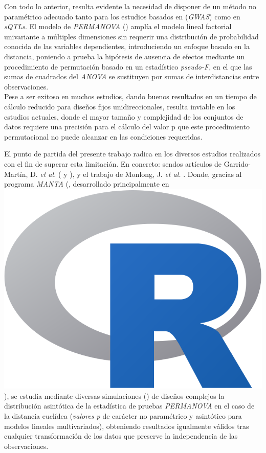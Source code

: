 \documentclass[IB,BIB]{TFUOC}%
\newcommand{\Rlogo}{\protect\includegraphics[height=2.5ex,keepaspectratio]{Rlogo.png}}
\begin{document}
Con todo lo anterior, resulta evidente la necesidad de disponer de un método no paramétrico adecuado tanto para los estudios basados en (\textit{GWAS}) como en \textit{sQTLs}. El modelo de \textit{PERMANOVA} (\cite{anderson_new_2001}) amplía el modelo lineal factorial univariante a múltiples dimensiones sin requerir una distribución de probabilidad conocida de las variables dependientes, introduciendo un enfoque basado en la distancia, poniendo a prueba la hipótesis de ausencia de efectos mediante un procedimiento de permutación basado en un estadístico \textit{\gls{pseudo-F}}, en el que las sumas de cuadrados del \textit{ANOVA} se sustituyen por sumas de interdistancias entre observaciones.\\
Pese a ser exitoso en muchos estudios, dando buenos resultados en un tiempo de cálculo reducido para diseños fijos unidireccionales, resulta inviable en los estudios actuales, donde el mayor tamaño y complejidad de los conjuntos de datos requiere una precisión para el cálculo del valor p que este procedimiento permutacional no puede alcanzar en las condiciones requeridas.

El punto de partida del presente trabajo radica en los diversos estudios realizados con el fin de superar esta limitación. En concreto: sendos artículos de Garrido-Martín, D. \textit{et al.} (\cite{garrido-martin_fast_2022} y \cite{garrido-martin_identification_2021}), y el trabajo de Monlong, J. \textit{et al.} \cite{monlong_identification_2014}. Donde, gracias al programa \textit{\gls{MANTA}} (\cite{garrido-martin_manta_2023}, desarrollado principalmente en \hspace{-.2em}\Rlogo\hspace{+.1em}), se estudia mediante diversas simulaciones (\cite{garrido-martin_manta-sim_2022}) de diseños complejos la distribución asintótica de la estadística de pruebas \textit{PERMANOVA} en el caso de la distancia euclídea (\textit{\gls{valores p}} de carácter no paramétrico y asintótico para modelos lineales multivariados), obteniendo resultados igualmente válidos tras cualquier transformación de los datos que preserve la independencia de las observaciones.

\end{document}
